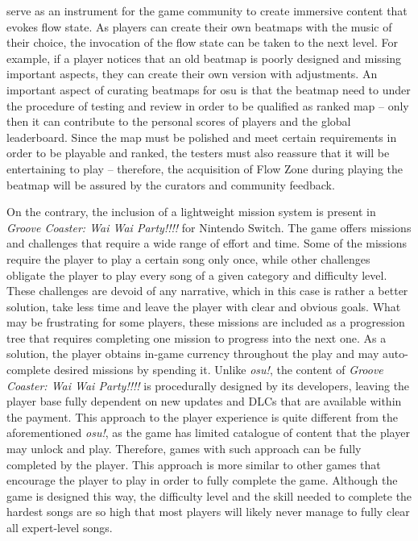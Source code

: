 serve as an instrument for the game community to create immersive content that evokes flow state. As players can create their own beatmaps with the music of their choice, the invocation of the flow state can be taken to the next level. For example, if a player notices that an old beatmap is poorly designed and missing important aspects, they can create their own version with adjustments. An important aspect of curating beatmaps for osu is that the beatmap need to under the procedure of testing and review in order to be qualified as ranked map -- only then it can contribute to the personal scores of players and the global leaderboard. Since the map must be polished and meet certain requirements in order to be playable and ranked, the testers must also reassure that it will be entertaining to play -- therefore, the acquisition of Flow Zone during playing the beatmap will be assured by the curators and community feedback. 

On the contrary, the inclusion of a lightweight mission system is present in \textit {Groove Coaster: Wai Wai Party!!!!} for Nintendo Switch. The game offers missions and challenges that require a wide range of effort and time. Some of the missions require the player to play a certain song only once, while other challenges obligate the player to play every song of a given category and difficulty level. These challenges are devoid of any narrative, which in this case is rather a better solution, take less time and leave the player with clear and obvious goals. What may be frustrating for some players, these missions are included as a progression tree that requires completing one mission to progress into the next one. As a solution, the player obtains in-game currency throughout the play and may auto-complete desired missions by spending it. Unlike \textit{osu!}, the content of \textit {Groove Coaster: Wai Wai Party!!!!} is procedurally designed by its developers, leaving the player base fully dependent on new updates and DLCs that are available within the payment. This approach to the player experience is quite different from the aforementioned \textit{osu!}, as the game has limited catalogue of content that the player may unlock and play. Therefore, games with such approach can be fully completed by the player. This approach is more similar to other games that encourage the player to play in order to fully complete the game. Although the game is designed this way, the difficulty level and the skill needed to complete the hardest songs are so high that most players will likely never manage to fully clear all expert-level songs.

